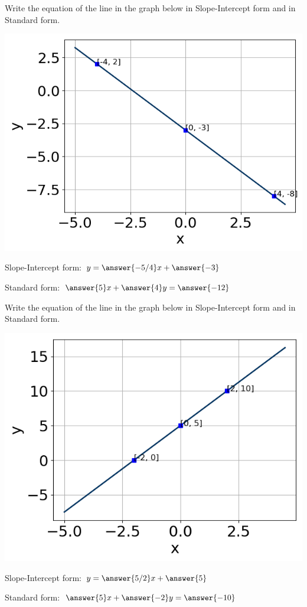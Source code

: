 \documentclass{ximera}
\begin{document}
\begin{question}
Write the equation of the line in the graph below in Slope-Intercept form and in Standard form. 

\includegraphics[scale=0.5]{question2.png}

Slope-Intercept form: $y = \answer{-5/4}x + \answer{-3}$

Standard form: $\answer{5} x + \answer{4} y = \answer{-12}$
\end{question}

\begin{question}
Write the equation of the line in the graph below in Slope-Intercept form and in Standard form. 

\includegraphics[scale=0.5]{question3.png}

Slope-Intercept form: $y = \answer{5/2}x + \answer{5}$

Standard form: $\answer{5} x + \answer{-2} y = \answer{-10}$
\end{question}
\end{document}
